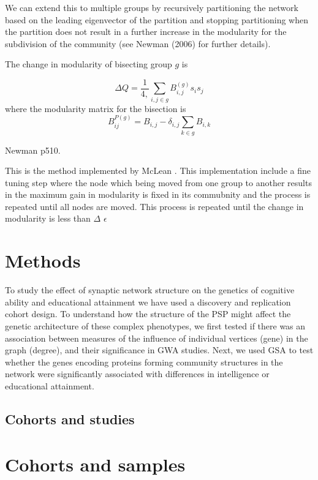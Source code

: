 We can extend this to multiple groups by recursively partitioning the network based on the leading eigenvector of the partition and stopping partitioning when the partition does not result in a further increase in the modularity for the subdivision of the community (see Newman (2006) for further details).

The change in modularity of bisecting group $g$ is 

\begin{equation}
    \Delta Q = \frac{1}{4,} \sum_{i,j \in g} B_{i,j}^{(g)}s_i s_j
\end{equation}
where the modularity matrix for the bisection is 
\begin{equation}
B_{ij}^{P(g)} = B_{i,j} - \delta_{i,j}\sum_{k \in g} B_{i,k}  
\end{equation}
\label{eq:Change in modularity spectral clustering}

Newman \cite{newman2018networks} p510.

This is the method implemented by McLean \cite{mclean2016improved}. This implementation include a fine tuning step where the node which being moved from one group to another results in the maximum gain in modularity is fixed in its commubnity and the process is repeated until all nodes are moved. This process is repeated until the change in modularity is less than $\Delta$ $\epsilon$





\section{Methods}
To study the effect of synaptic network structure on the genetics of cognitive ability and educational attainment we have used a discovery and replication cohort design. To understand how the structure of the PSP might affect the genetic architecture of these complex phenotypes, we first tested if there was an association between measures of the influence of individual vertices (gene) in the graph (degree), and their significance in GWA studies. 
Next, we used GSA to test whether the genes encoding proteins forming community structures in the network were significantly associated with differences in intelligence or educational attainment. 

\subsection{Cohorts and studies}
\section{Cohorts and samples}

